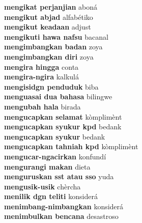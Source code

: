 \textbf{ mengikat perjanjian  } aboná \\
\textbf{ mengikut abjad  } alfabétiko \\
\textbf{ mengikut keadaan  } adjust \\
\textbf{ mengikuti hawa nafsu  } bacanal \\
\textbf{ mengimbangkan badan  } zoya \\
\textbf{ mengimbangkan diri  } zoya \\
\textbf{ mengira hingga  } conta \\
\textbf{ mengira-ngira  } kalkulá \\
\textbf{ mengisidgn penduduk  } biba \\
\textbf{ menguasai dua bahasa  } bilingwe \\
\textbf{ mengubah hala  } birada \\
\textbf{ mengucapkan selamat  } kòmplimènt \\
\textbf{ mengucapkan syukur kpd  } bedank \\
\textbf{ mengucapkan syukur  } bedank \\
\textbf{ mengucapkan tahniah kpd  } kòmplimènt \\
\textbf{ mengucar-ngacirkan  } konfundí \\
\textbf{ mengurangi makan  } dieta \\
\textbf{ menguruskan sst atau sso  } yuda \\
\textbf{ mengusik-usik  } chèrcha \\
\textbf{ menilik dgn teliti  } konsiderá \\
\textbf{ menimbang-nimbangkan  } konsiderá \\
\textbf{ menimbulkan bencana  } desastroso \\
